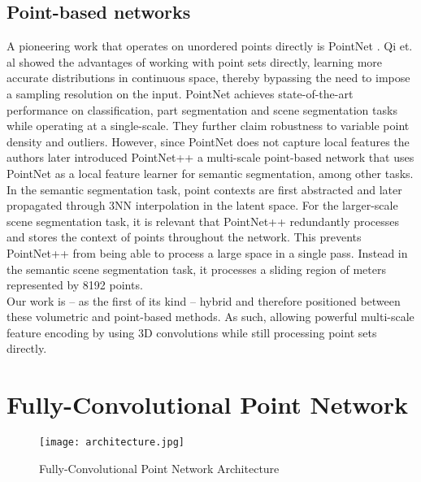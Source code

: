 \documentclass[runningheads]{llncs}
\begin{document}
\subsection{Point-based networks}
\label{section:point-networks}

A pioneering work that operates on unordered points directly is PointNet \cite{Qi2017}. Qi et. al showed the advantages of working with point sets directly, learning more accurate distributions in continuous space, thereby bypassing the need to impose a sampling resolution on the input. PointNet achieves state-of-the-art performance on classification, part segmentation and scene segmentation tasks while operating at a single-scale. They further claim robustness to variable point density and outliers. However, since PointNet does not capture local features the authors later introduced PointNet++ \cite{Qi2017_2} 
a multi-scale point-based network that uses PointNet as a local feature learner for semantic segmentation, among other tasks. In the semantic segmentation task, point contexts are first abstracted and later propagated through 3NN interpolation in the latent space. For the larger-scale scene segmentation task, it is relevant that PointNet++ redundantly processes and stores the context of points throughout the network. This prevents PointNet++ from being able to process a large space in a single pass. Instead in the semantic scene segmentation task, it processes a sliding region of  meters represented by 8192 points.\\ 

Our work is -- as the first of its kind -- hybrid and therefore positioned between these volumetric and point-based methods.
As such, allowing powerful multi-scale feature encoding by using 3D convolutions while still processing point sets directly.



\section{Fully-Convolutional Point Network}

\begin{figure}[h]
    \centering
 \texttt{[image: architecture.jpg]} 
    \caption{Fully-Convolutional Point Network Architecture}
    \label{fig:architecture} 
\end{figure}
\end{document}
